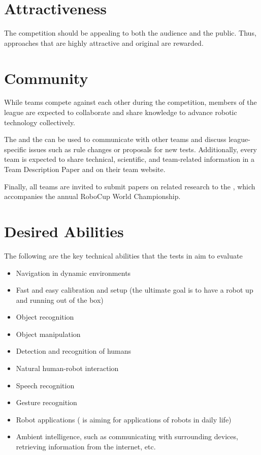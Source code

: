 \section{Attractiveness}\label{concept:attractiveness}

The competition should be appealing to both the audience and the public. Thus, approaches that are highly attractive and original are rewarded.

\section{Community}\label{concept:community}

While teams compete against each other during the competition, members of the \AtHome{} league are expected to collaborate and share knowledge to advance robotic technology collectively.

The  and the \RR{} can be used to communicate with other teams and discuss league-specific issues such as rule changes or proposals for new tests.
Additionally, every team is expected to share technical, scientific, and team-related information in a Team Description Paper and on their team website.

Finally, all teams are invited to submit papers on related research to the \Symp{}, which accompanies the annual RoboCup World Championship.

\section{Desired Abilities}\label{concept:desired_abilities}

The following are the key technical abilities that the tests in \AtHome{} aim to evaluate

\begin{itemize}
    \item Navigation in dynamic environments
    \item Fast and easy calibration and setup (the ultimate goal is to have a robot up and running out of the box)
    \item Object recognition
    \item Object manipulation
    \item Detection and recognition of humans
    \item Natural human-robot interaction
    \item Speech recognition
    \item Gesture recognition
    \item Robot applications (\AtHome{} is aiming for applications of robots in daily life)
    \item Ambient intelligence, such as communicating with surrounding devices, retrieving information from the internet, etc.
\end{itemize}


